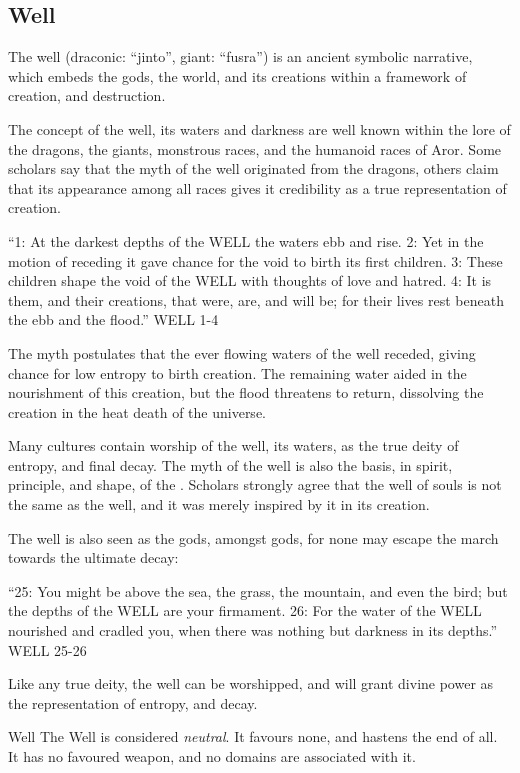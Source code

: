 \subsection{Well}
\label{sec:Well}

The well (draconic: ``jinto'', giant: ``fusra'') is an ancient symbolic
narrative, which embeds the gods, the world, and its creations within a
framework of creation, and destruction.

The concept of the well, its waters and darkness are well known within the lore
of the dragons, the giants, monstrous races, and the humanoid races of Aror.
Some scholars say that the myth of the well originated from the dragons, others
claim that its appearance among all races gives it credibility as a true 
representation of creation.

\begin{displayquote}
  ``1: At the darkest depths of the WELL the waters ebb and rise. 2: Yet in the
  motion of receding it gave chance for the void to birth its first children. 3:
  These children shape the void of the WELL with thoughts of love and hatred. 4:
  It is them, and their creations, that were, are, and will be; for their lives
  rest beneath the ebb and the flood.'' WELL 1-4
\end{displayquote}

The myth postulates that the ever flowing waters of the well receded, giving
chance for low entropy to birth creation. The remaining water aided in the
nourishment of this creation, but the flood threatens to return, dissolving
the creation in the heat death of the universe.

Many cultures contain worship of the well, its waters, as the true deity of
entropy, and final decay. The myth of the well is also the basis, in spirit,
principle, and shape, of the . Scholars strongly
agree that the well of souls is not the same as the well, and it was merely
inspired by it in its creation.

The well is also seen as the gods, amongst gods, for none may escape the march
towards the ultimate decay:

\begin{displayquote}
  ``25: You might be above the sea, the grass, the mountain, and even the bird;
  but the depths of the WELL are your firmament. 26: For the water of the WELL
  nourished and cradled you, when there was nothing but darkness in its
  depths.'' WELL 25-26
\end{displayquote}

Like any true deity, the well can be worshipped, and will grant divine power as
the representation of entropy, and decay.

\begin{35e}{Well}
  The Well is considered \emph{neutral}. It favours none, and hastens the end of
  all. It has no favoured weapon, and no domains are associated with it.
\end{35e}
